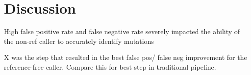 \documentclass{article}
\begin{document}
\section{Discussion}
\begin{outline}
	\item High false positive rate and false negative rate severely impacted the ability of the non-ref caller to accurately identify mutations
	\item X was the step that resulted in the best false pos/ false neg improvement for the reference-free caller. Compare this for best step in traditional pipeline.
\end{outline}

\end{document}
